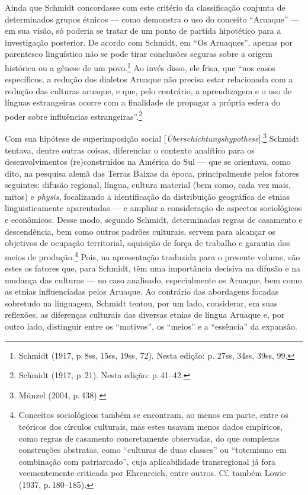 Ainda que Schmidt concordasse com este critério da classificação
conjunta de determinados grupos étnicos --- como demonstra o uso do
conceito ``Aruaque'' --- em sua visão, só poderia se tratar de um ponto
de partida hipotético para a investigação posterior. De acordo com
Schmidt, em ``Os Aruaques'', apenas por parentesco linguístico não se
pode tirar conclusões seguras sobre a origem histórica ou a gênese de um
povo.\footnote{Schmidt (1917, p.\,8ss, 15ss, 19ss, 72). Nesta edição: p.
  27ss, 34ss, 39ss, 99.} Ao invés disso, ele frisa, que ``nos casos
específicos, a redução dos dialetos Aruaque não precisa estar
relacionada com a redução das culturas aruaque, e que, pelo contrário, a
aprendizagem e o uso de línguas estrangeiras ocorre com a finalidade de
propagar a própria esfera do poder sobre influências
estrangeiras''.\footnote{Schmidt (1917, p.\,21). Nesta edição: p.\,41--42.}

Com sua hipótese de superimposição social
{[}\textit{Überschichtungshypothese}{]},\footnote{Münzel (2004, p.\,438).}
Schmidt tentava, dentre outras coisas, diferenciar o contexto analítico
para os desenvolvimentos (re)construídos na América do Sul --- que se
orientava, como dito, na pesquisa alemã das Terras Baixas da época,
principalmente pelos fatores seguintes: difusão regional, língua,
cultura material (bem como, cada vez mais, mitos) e \textit{physis},
focalizando a identificação da distribuição geográfica de etnias
linguisticamente aparentadas --- e ampliar a consideração de aspectos
sociológicos e econômicos. Desse modo, segundo Schmidt, determinadas
regras de casamento e descendência, bem como outros padrões culturais,
servem para alcançar os objetivos de ocupação territorial, aquisição de
força de trabalho e garantia dos meios de produção.\footnote{Conceitos
  sociológicos também se encontram, ao menos em parte, entre os teóricos
  dos círculos culturais, mas estes usavam menos dados empíricos, como
  regras de casamento concretamente observadas, do que complexas
  construções abstratas, como ``culturas de duas classes'' ou
  ``totemismo em combinação com patriarcado'', cuja aplicabilidade
  transregional já fora veementemente criticada por Ehrenreich, entre
  outros. Cf. também Lowie (1937, p.\,180--185).} Pois, na apresentação
traduzida para o presente volume, são estes os fatores que, para
Schmidt, têm uma importância decisiva na difusão e na mudança das
culturas --- no caso analisado, especialmente os Aruaque, bem como as
etnias influenciadas pelos Aruaque. Ao contrário das abordagens focadas
sobretudo na linguagem, Schmidt tentou, por um lado, considerar, em
suas reflexões, as diferenças culturais das diversas etnias de língua
Aruaque e, por outro lado, distinguir entre os ``motivos'', os ``meios''
e a ``essência'' da expansão.

